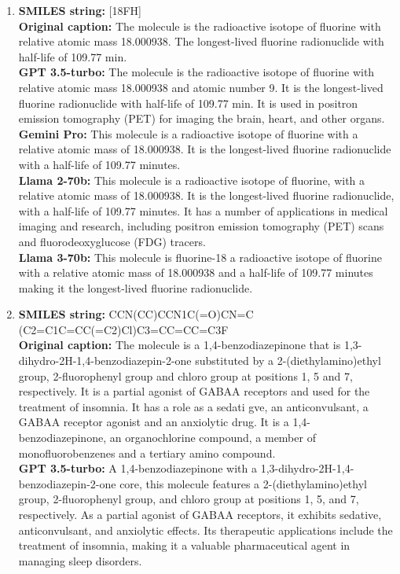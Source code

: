 \begin{enumerate}[leftmargin=*]\itemsep0em
    \item 
    \textbf{SMILES string:} [18FH] \\
    \textbf{Original caption:} The molecule is the radioactive isotope of fluorine with relative atomic mass 18.000938. The longest-lived fluorine radionuclide with half-life of 109.77 min. \\
    \textbf{GPT 3.5-turbo:} The molecule is the radioactive isotope of fluorine with relative atomic mass 18.000938 and atomic number 9. It is the longest-lived fluorine radionuclide with half-life of 109.77 min. It is used in positron emission tomography (PET) for imaging the brain, heart, and other organs. \\
    \textbf{Gemini Pro:} This molecule is a radioactive isotope of fluorine with a relative atomic mass of 18.000938. It is the longest-lived fluorine radionuclide with a half-life of 109.77 minutes. \\
    \textbf{Llama 2-70b:} This molecule is a radioactive isotope of fluorine, with a relative atomic mass of 18.000938. It is the longest-lived fluorine radionuclide, with a half-life of 109.77 minutes. It has a number of applications in medical imaging and research, including positron emission tomography (PET) scans and fluorodeoxyglucose (FDG) tracers. \\
    \textbf{Llama 3-70b:} This molecule is fluorine-18 a radioactive isotope of fluorine with a relative atomic mass of 18.000938 and a half-life of 109.77 minutes making it the longest-lived fluorine radionuclide. \\
    \item 
    \textbf{SMILES string:} CCN(CC)CCN1C(=O)CN=C\\(C2=C1C=CC(=C2)Cl)C3=CC=CC=C3F \\
    \textbf{Original caption:} The molecule is a 1,4-benzodiazepinone that is 1,3-dihydro-2H-1,4-benzodiazepin-2-one substituted by a 2-(diethylamino)ethyl group, 2-fluorophenyl group and chloro group at positions 1, 5 and 7, respectively. It is a partial agonist of GABAA receptors and used for the treatment of insomnia. It has a role as a sedati gve, an anticonvulsant, a GABAA receptor agonist and an anxiolytic drug. It is a 1,4-benzodiazepinone, an organochlorine compound, a member of monofluorobenzenes and a tertiary amino compound. \\
    \textbf{GPT 3.5-turbo:} A 1,4-benzodiazepinone with a 1,3-dihydro-2H-1,4-benzodiazepin-2-one core, this molecule features a 2-(diethylamino)ethyl group, 2-fluorophenyl group, and chloro group at positions 1, 5, and 7, respectively. As a partial agonist of GABAA receptors, it exhibits sedative, anticonvulsant, and anxiolytic effects. Its therapeutic applications include the treatment of insomnia, making it a valuable pharmaceutical agent in managing sleep disorders. \\

\end{enumerate}
